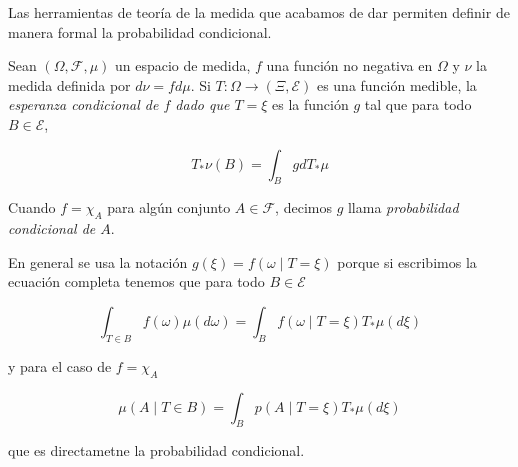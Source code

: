 \documentclass[main.tex]{subfiles}
\begin{document}
Las herramientas de teoría de la medida que acabamos de dar permiten definir de manera formal la probabilidad condicional.

\begin{definition}
Sean $(\Omega, \mathcal{F}, \mu)$ un espacio de medida, $f$ una función no negativa en $\Omega$  y $\nu$ la medida definida por $d\nu = fd\mu$. Si $T:\Omega \to (\Xi, \mathcal{E})$ es una función medible, la  \textit{esperanza condicional de $f$ dado que $T=\xi$} es la función $g$ tal que para todo $B\in\mathcal{E}$,

\begin{equation*}
	T_*\nu(B) = \int_B gdT_*\mu
\end{equation*}

Cuando $f=\chi_A$ para algún conjunto $A\in\mathcal{F}$, decimos $g$ llama \textit{probabilidad condicional de $A$}.
\end{definition}

En general se usa la notación $g(\xi) = f\left(\omega \mid T=\xi\right)$ porque si escribimos la ecuación completa tenemos que para todo $B\in\mathcal{E}$

\begin{equation*}
	\int_{T\in B} f(\omega)\mu(d\omega)
	= \int _B f(\omega \mid T=\xi)T_*\mu(d\xi)
\end{equation*}

y para el caso de $f=\chi_A$

\begin{equation*}
\mu\left(A\mid T\in B\right) = 
	\int _B p(A \mid T=\xi)T_*\mu(d\xi) 	
\end{equation*}

que es directametne la probabilidad condicional.
\end{document}
